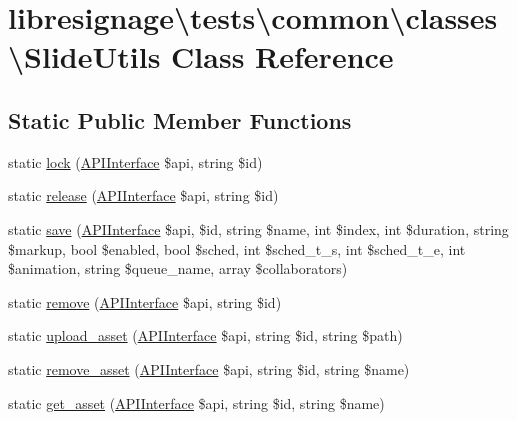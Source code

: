 \hypertarget{classlibresignage_1_1tests_1_1common_1_1classes_1_1SlideUtils}{}\section{libresignage\textbackslash{}tests\textbackslash{}common\textbackslash{}classes\textbackslash{}Slide\+Utils Class Reference}
\label{classlibresignage_1_1tests_1_1common_1_1classes_1_1SlideUtils}
\subsection*{Static Public Member Functions}
\begin{DoxyCompactItemize}
\item 
static \hyperlink{classlibresignage_1_1tests_1_1common_1_1classes_1_1SlideUtils_a77cb868fff118096632abccd9a8ad58a}{lock} (\hyperlink{classlibresignage_1_1tests_1_1common_1_1classes_1_1APIInterface}{A\+P\+I\+Interface} \$api, string \$id)
\item 
static \hyperlink{classlibresignage_1_1tests_1_1common_1_1classes_1_1SlideUtils_a44efce21d77a7523dd240c3d5ee2ee67}{release} (\hyperlink{classlibresignage_1_1tests_1_1common_1_1classes_1_1APIInterface}{A\+P\+I\+Interface} \$api, string \$id)
\item 
static \hyperlink{classlibresignage_1_1tests_1_1common_1_1classes_1_1SlideUtils_aeeef7df2a56d96fdb8455b40abd6b28c}{save} (\hyperlink{classlibresignage_1_1tests_1_1common_1_1classes_1_1APIInterface}{A\+P\+I\+Interface} \$api, \$id, string \$name, int \$index, int \$duration, string \$markup, bool \$enabled, bool \$sched, int \$sched\+\_\+t\+\_\+s, int \$sched\+\_\+t\+\_\+e, int \$animation, string \$queue\+\_\+name, array \$collaborators)
\item 
static \hyperlink{classlibresignage_1_1tests_1_1common_1_1classes_1_1SlideUtils_a54dfe7ef2953cf074420d902116d5b6b}{remove} (\hyperlink{classlibresignage_1_1tests_1_1common_1_1classes_1_1APIInterface}{A\+P\+I\+Interface} \$api, string \$id)
\item 
static \hyperlink{classlibresignage_1_1tests_1_1common_1_1classes_1_1SlideUtils_a106e2422a9edc3e59eca468ccad17c74}{upload\+\_\+asset} (\hyperlink{classlibresignage_1_1tests_1_1common_1_1classes_1_1APIInterface}{A\+P\+I\+Interface} \$api, string \$id, string \$path)
\item 
static \hyperlink{classlibresignage_1_1tests_1_1common_1_1classes_1_1SlideUtils_a4b07bdeb0b0da8c33d74e3821314e6bd}{remove\+\_\+asset} (\hyperlink{classlibresignage_1_1tests_1_1common_1_1classes_1_1APIInterface}{A\+P\+I\+Interface} \$api, string \$id, string \$name)
\item 
static \hyperlink{classlibresignage_1_1tests_1_1common_1_1classes_1_1SlideUtils_a6dfbbb847934c6a212fa2aeb5a1bcd14}{get\+\_\+asset} (\hyperlink{classlibresignage_1_1tests_1_1common_1_1classes_1_1APIInterface}{A\+P\+I\+Interface} \$api, string \$id, string \$name)
\end{DoxyCompactItemize}


